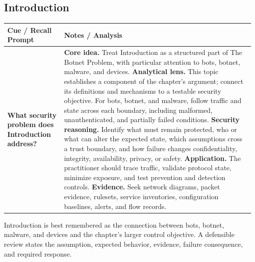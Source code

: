 \documentclass[11pt]{article}
\newcommand{\CornellHeader}{%
\rowcolor{Navy}\color{white}\bfseries Cue / Recall Prompt & \color{white}\bfseries Notes / Analysis\\\hline}
\newcommand{\CornellRow}[2]{%
\cellcolor{CueGray}\RaggedRight\textbf{#1} & \RaggedRight #2\\\hline}
\begin{document}
\subsection*{Introduction}
\begin{longtable}{>{\RaggedRight\arraybackslash}p{}|>{\RaggedRight\arraybackslash}p{}}
\CornellHeader
\CornellRow{What security problem does Introduction address?}{\textbf{Core idea.} Treat Introduction as a structured part of The Botnet Problem, with particular attention to bots, botnet, malware, and devices. \textbf{Analytical lens.} This topic establishes a component of the chapter's argument; connect its definitions and mechanisms to a testable security objective. For bots, botnet, and malware, follow traffic and state across each boundary, including malformed, unauthenticated, and partially failed conditions. \textbf{Security reasoning.} Identify what must remain protected, who or what can alter the expected state, which assumptions cross a trust boundary, and how failure changes confidentiality, integrity, availability, privacy, or safety. \textbf{Application.} The practitioner should trace traffic, validate protocol state, minimize exposure, and test prevention and detection controls. \textbf{Evidence.} Seek network diagrams, packet evidence, rulesets, service inventories, configuration baselines, alerts, and flow records.}
\end{longtable}
\begin{topicsummary}
Introduction is best remembered as the connection between bots, botnet, malware, and devices and the chapter's larger control objective. A defensible review states the assumption, expected behavior, evidence, failure consequence, and required response.
\end{topicsummary}
\end{document}
